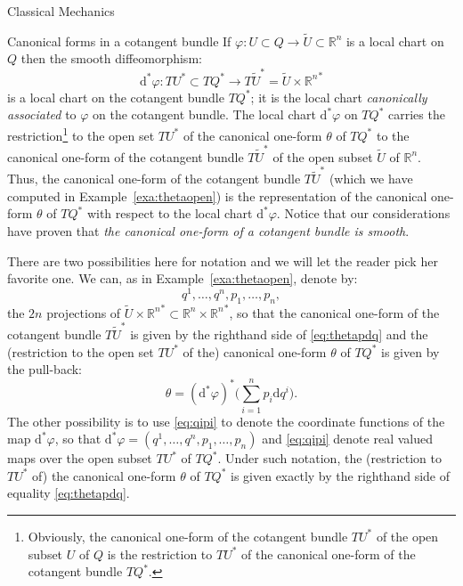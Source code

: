 \documentclass[oneside,a4paper,11pt]{amsbook}
\newcommand{\R}{\mathds R}
\newcommand{\dd}{\mathrm d}
\theoremstyle{remark}\newtheorem{exercise}{Exercise}[chapter]
\theoremstyle{plain}\newtheorem{teo}{Theorem}[section]
\theoremstyle{plain}\newtheorem{lem}[teo]{Lemma}
\theoremstyle{plain}\newtheorem{prop}[teo]{Proposition}
\theoremstyle{plain}\newtheorem{cor}[teo]{Corollary}
\theoremstyle{definition}\newtheorem{defin}[teo]{Definition}
\theoremstyle{remark}\newtheorem{rem}[teo]{Remark}
\theoremstyle{definition}\newtheorem{notation}[teo]{Notation}
\theoremstyle{definition}\newtheorem{convention}[teo]{Convention}
\theoremstyle{definition}\newtheorem{example}[teo]{Example}
\numberwithin{section}{chapter}
\numberwithin{equation}{section}
\begin{document}
\begin{chapter}{Classical Mechanics}
\begin{section}{Canonical forms in a cotangent bundle}
If $\varphi:U\subset Q\to\widetilde U\subset\R^n$ is a local chart on $Q$ then the smooth diffeomorphism:
\[\dd^*\varphi:TU^*\subset TQ^*\longrightarrow T\widetilde U^*=\widetilde U\times{\R^n}^*\]
is a local chart on the cotangent bundle $TQ^*$; it is the local chart {\em canonically associated\/} to $\varphi$ on the cotangent bundle.
The local chart $\dd^*\varphi$ on $TQ^*$ carries the restriction\footnote{%
Obviously, the canonical one-form of the cotangent bundle $TU^*$ of the open subset $U$ of $Q$ is the restriction to $TU^*$ of the canonical one-form
of the cotangent bundle $TQ^*$.} to the open set $TU^*$ of the canonical one-form $\theta$ of $TQ^*$ to the canonical one-form of the cotangent
bundle $T\widetilde U^*$ of the open subset $\widetilde U$ of $\R^n$. Thus, the canonical one-form of the cotangent
bundle $T\widetilde U^*$ (which we have computed in Example~\ref{exa:thetaopen})
is the representation of the canonical one-form $\theta$ of $TQ^*$ with respect to the local chart $\dd^*\varphi$.
Notice that our considerations have proven that {\em the canonical one-form of a cotangent bundle is smooth}.

There are two possibilities here for notation and we will let the reader pick her favorite
one. We can, as in Example~\ref{exa:thetaopen}, denote by:
\begin{equation}\label{eq:qipi}
q^1,\ldots,q^n,p_1,\ldots,p_n,
\end{equation}
the $2n$ projections of $\widetilde U\times{\R^n}^*\subset\R^n\times{\R^n}^*$,
so that the canonical one-form of the cotangent bundle $T\widetilde U^*$ is given by the righthand side of \eqref{eq:thetapdq} and the (restriction
to the open set $TU^*$ of the) canonical one-form $\theta$ of $TQ^*$ is given by the pull-back:
\[\theta=(\dd^*\varphi)^*\Big(\sum_{i=1}^np_i\dd q^i\Big).\]
The other possibility is to use \eqref{eq:qipi} to denote the coordinate functions of the map $\dd^*\varphi$, so that
$\dd^*\varphi=(q^1,\ldots,q^n,p_1,\ldots,p_n)$ and \eqref{eq:qipi} denote real valued maps over the open subset $TU^*$ of $TQ^*$.
Under such notation, the (restriction to $TU^*$ of) the canonical one-form $\theta$ of $TQ^*$ is given exactly by the righthand side of equality \eqref{eq:thetapdq}.


\end{section}
\end{chapter}
\end{document}
